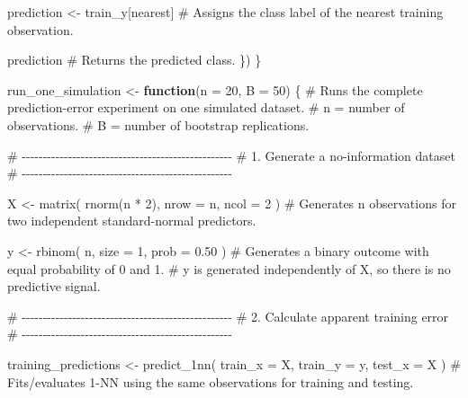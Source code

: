 \documentclass[
  letterpaper,
  DIV=11,
  numbers=noendperiod]{scrreprt}
\newenvironment{Shaded}{\begin{snugshade}}{\end{snugshade}}
\newcommand{\AttributeTok}[1]{\textcolor[rgb]{0.40,0.45,0.13}{#1}}
\newcommand{\CommentTok}[1]{\textcolor[rgb]{0.37,0.37,0.37}{#1}}
\newcommand{\ControlFlowTok}[1]{\textcolor[rgb]{0.00,0.23,0.31}{\textbf{#1}}}
\newcommand{\DecValTok}[1]{\textcolor[rgb]{0.68,0.00,0.00}{#1}}
\newcommand{\FloatTok}[1]{\textcolor[rgb]{0.68,0.00,0.00}{#1}}
\newcommand{\FunctionTok}[1]{\textcolor[rgb]{0.28,0.35,0.67}{#1}}
\newcommand{\NormalTok}[1]{\textcolor[rgb]{0.00,0.23,0.31}{#1}}
\newcommand{\OtherTok}[1]{\textcolor[rgb]{0.00,0.23,0.31}{#1}}
\newcommand{\SpecialCharTok}[1]{\textcolor[rgb]{0.37,0.37,0.37}{#1}}
\begin{document}
\begin{Shaded}
\begin{Highlighting}[]
\NormalTok{    prediction }\OtherTok{\textless{}{-}}\NormalTok{ train\_y[nearest]}
    \CommentTok{\# Assigns the class label of the nearest training observation.}

\NormalTok{    prediction}
    \CommentTok{\# Returns the predicted class.}
\NormalTok{  \})}
\NormalTok{\}}


\NormalTok{run\_one\_simulation }\OtherTok{\textless{}{-}} \ControlFlowTok{function}\NormalTok{(}\AttributeTok{n =} \DecValTok{20}\NormalTok{, }\AttributeTok{B =} \DecValTok{50}\NormalTok{) \{}
  \CommentTok{\# Runs the complete prediction{-}error experiment on one simulated dataset.}
  \CommentTok{\# n = number of observations.}
  \CommentTok{\# B = number of bootstrap replications.}


  \CommentTok{\# {-}{-}{-}{-}{-}{-}{-}{-}{-}{-}{-}{-}{-}{-}{-}{-}{-}{-}{-}{-}{-}{-}{-}{-}{-}{-}{-}{-}{-}{-}{-}{-}{-}{-}{-}{-}{-}{-}{-}{-}{-}{-}{-}{-}{-}{-}{-}{-}{-}{-}}
  \CommentTok{\# 1. Generate a no{-}information dataset}
  \CommentTok{\# {-}{-}{-}{-}{-}{-}{-}{-}{-}{-}{-}{-}{-}{-}{-}{-}{-}{-}{-}{-}{-}{-}{-}{-}{-}{-}{-}{-}{-}{-}{-}{-}{-}{-}{-}{-}{-}{-}{-}{-}{-}{-}{-}{-}{-}{-}{-}{-}{-}{-}}

\NormalTok{  X }\OtherTok{\textless{}{-}} \FunctionTok{matrix}\NormalTok{(}
    \FunctionTok{rnorm}\NormalTok{(n }\SpecialCharTok{*} \DecValTok{2}\NormalTok{),}
    \AttributeTok{nrow =}\NormalTok{ n,}
    \AttributeTok{ncol =} \DecValTok{2}
\NormalTok{  )}
  \CommentTok{\# Generates n observations for two independent standard{-}normal predictors.}

\NormalTok{  y }\OtherTok{\textless{}{-}} \FunctionTok{rbinom}\NormalTok{(}
\NormalTok{    n,}
    \AttributeTok{size =} \DecValTok{1}\NormalTok{,}
    \AttributeTok{prob =} \FloatTok{0.50}
\NormalTok{  )}
  \CommentTok{\# Generates a binary outcome with equal probability of 0 and 1.}
  \CommentTok{\# y is generated independently of X, so there is no predictive signal.}


  \CommentTok{\# {-}{-}{-}{-}{-}{-}{-}{-}{-}{-}{-}{-}{-}{-}{-}{-}{-}{-}{-}{-}{-}{-}{-}{-}{-}{-}{-}{-}{-}{-}{-}{-}{-}{-}{-}{-}{-}{-}{-}{-}{-}{-}{-}{-}{-}{-}{-}{-}{-}{-}}
  \CommentTok{\# 2. Calculate apparent training error}
  \CommentTok{\# {-}{-}{-}{-}{-}{-}{-}{-}{-}{-}{-}{-}{-}{-}{-}{-}{-}{-}{-}{-}{-}{-}{-}{-}{-}{-}{-}{-}{-}{-}{-}{-}{-}{-}{-}{-}{-}{-}{-}{-}{-}{-}{-}{-}{-}{-}{-}{-}{-}{-}}

\NormalTok{  training\_predictions }\OtherTok{\textless{}{-}} \FunctionTok{predict\_1nn}\NormalTok{(}
    \AttributeTok{train\_x =}\NormalTok{ X,}
    \AttributeTok{train\_y =}\NormalTok{ y,}
    \AttributeTok{test\_x =}\NormalTok{ X}
\NormalTok{  )}
  \CommentTok{\# Fits/evaluates 1{-}NN using the same observations for training and testing.}


\end{Highlighting}
\end{Shaded}
\end{document}
